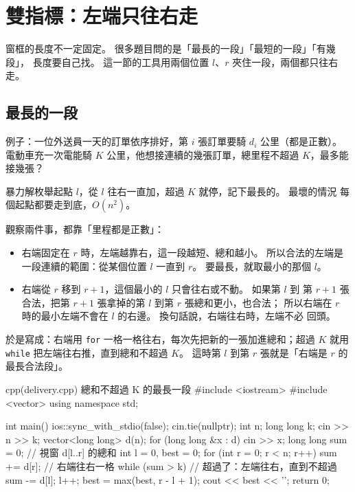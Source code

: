 \section{雙指標：左端只往右走}
\label{sec:ps-two}

窗框的長度不一定固定。 很多題目問的是「最長的一段」「最短的一段」「有幾段」，
長度要自己找。 這一節的工具用兩個位置 $l$、$r$ 夾住一段，兩個都只往右走。

\subsection{最長的一段}

例子：一位外送員一天的訂單依序排好，第 $i$ 張訂單要騎 $d_i$ 公里（都是正數）。
電動車充一次電能騎 $K$ 公里，他想接連續的幾張訂單，總里程不超過 $K$，最多能
接幾張？

暴力解枚舉起點 $l$，從 $l$ 往右一直加，超過 $K$ 就停，記下最長的。 最壞的情況
每個起點都要走到底，$O(n^2)$。

觀察兩件事，都靠「里程都是正數」：

\begin{itemize}
\item 右端固定在 $r$ 時，左端越靠右，這一段越短、總和越小。 所以合法的左端是
一段連續的範圍：從某個位置 $l$ 一直到 $r$。 要最長，就取最小的那個 $l$。
\item 右端從 $r$ 移到 $r + 1$，這個最小的 $l$ 只會往右或不動。 如果第 $l$ 到
第 $r + 1$ 張合法，把第 $r + 1$ 張拿掉的第 $l$ 到第 $r$ 張總和更小，也合法；
所以右端在 $r$ 時的最小左端不會在 $l$ 的右邊。 換句話說，右端往右時，左端不必
回頭。
\end{itemize}

於是寫成：右端用 \texttt{for} 一格一格往右，每次先把新的一張加進總和；超過
$K$ 就用 \texttt{while} 把左端往右推，直到總和不超過 $K$。 這時第 $l$ 到第 $r$
張就是「右端是 $r$ 的最長合法段」。

\begin{example}[label=ex:ps-delivery]{cpp}{(delivery.cpp) 總和不超過 K 的最長一段}
#include <iostream>
#include <vector>
using namespace std;

int main() {
    ios::sync_with_stdio(false);
    cin.tie(nullptr);
    int n;
    long long k;
    cin >> n >> k;
    vector<long long> d(n);
    for (long long &x : d) {
        cin >> x;
    }
    long long sum = 0;           // 視窗 d[l..r] 的總和
    int l = 0, best = 0;
    for (int r = 0; r < n; r++) {
        sum += d[r];             // 右端往右一格
        while (sum > k) {        // 超過了：左端往右，直到不超過
            sum -= d[l];
            l++;
        }
        best = max(best, r - l + 1);
    }
    cout << best << '\n';
    return 0;
}
\end{example}

